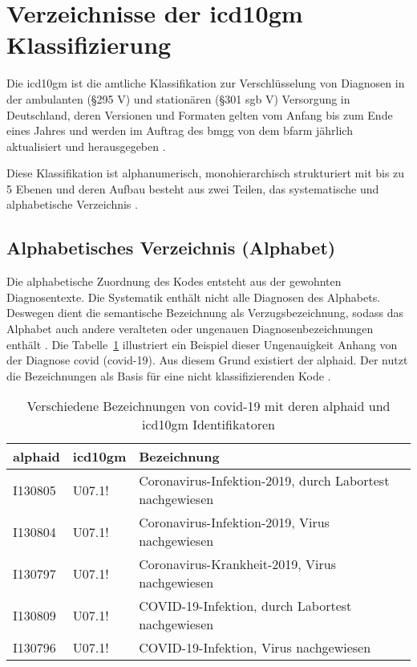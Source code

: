 \section{Verzeichnisse der \acs{icd10gm} Klassifizierung} \label{sec:difclass}

Die \ac{icd10gm} ist die amtliche Klassifikation zur Verschlüsselung von Diagnosen in der ambulanten (\S 295  V) und stationären (\S 301 \ac{sgb} V) Versorgung in Deutschland, deren Versionen und Formaten gelten vom Anfang bis zum Ende eines Jahres und werden im Auftrag des \ac{bmgg} von dem \ac{bfarm} jährlich aktualisiert und herausgegeben \cite{icd10}. 

Diese Klassifikation ist alphanumerisch, monohierarchisch strukturiert mit bis zu 5 Ebenen und deren Aufbau besteht aus zwei Teilen, das systematische und alphabetische Verzeichnis \cite{icd10}.

\subsection{Alphabetisches Verzeichnis (Alphabet)} \label{subsec:alphabetic}

Die alphabetische Zuordnung des Kodes entsteht aus der gewohnten Diagnosentexte. Die Systematik enthält nicht alle Diagnosen des Alphabets. Deswegen dient die semantische Bezeichnung als Verzugsbezeichnung, sodass das Alphabet auch andere veralteten oder ungenauen Diagnosenbezeichnungen enthält \cite{icd10alpha}. Die Tabelle~\ref{tab:difbe} illustriert ein Beispiel dieser Ungenauigkeit Anhang von der Diagnose \acl{covid} (\acs{covid}-19). Aus diesem Grund existiert der \ac{alphaid}. Der nutzt die Bezeichnungen als Basis für eine nicht klassifizierenden Kode \cite{icd10alpha}.

\begin{table}[ht]
	\centering
	\small
	\caption[Verschiedene Bezeichnungen von COVID-19]{Verschiedene Bezeichnungen von \ac{covid}-19 mit deren \ac{alphaid} und \ac{icd10gm} Identifikatoren}
	\label{tab:difbe}
	\begin{tabular}{|l|l|l|}
		\hline
		\rowcolor{lightgray} \ac{alphaid} & \ac{icd10gm} & Bezeichnung \\
		\hline
		I130805 & U07.1! & Coronavirus-Infektion-2019, durch Labortest nachgewiesen \\ \hline
		I130804 & U07.1! & Coronavirus-Infektion-2019, Virus nachgewiesen \\ \hline
		I130797 & U07.1! & Coronavirus-Krankheit-2019, Virus nachgewiesen \\ \hline
		I130809 & U07.1! & COVID-19-Infektion, durch Labortest nachgewiesen \\ \hline
		I130796 & U07.1! & COVID-19-Infektion, Virus nachgewiesen \\ \hline				
	\end{tabular}
\end{table}

